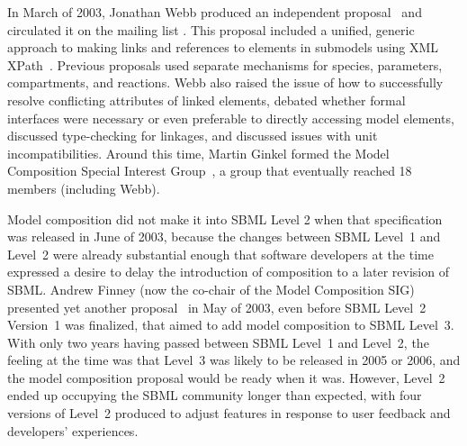 In March of 2003, Jonathan Webb produced an independent proposal~\citep{webb:2003} and circulated it on the mailing list .  This proposal included a unified, generic approach to making links and references to elements in submodels using XML XPath~\citep{xpath}.  Previous proposals used separate mechanisms for species, parameters, compartments, and reactions.  Webb also raised the issue of how to successfully resolve conflicting attributes of linked elements, debated whether formal interfaces were necessary or even preferable to directly accessing model elements, discussed type-checking for linkages, and discussed issues with unit incompatibilities.  Around this time, Martin Ginkel formed the Model Composition Special Interest Group~\citep{comp-sig}, a group that eventually reached 18 members (including Webb).

Model composition did not make it into SBML Level 2 when that specification was released in June of 2003, because the changes between SBML Level~1 and Level~2 were already substantial enough that software developers at the time expressed a desire to delay the introduction of composition to a later revision of SBML.  Andrew Finney (now the co-chair of the Model Composition SIG) presented yet another proposal~\citep{finney:2003} in May of 2003, even before SBML Level~2 Version~1 was finalized, that aimed to add model composition to SBML Level~3.  With only two years having passed between SBML Level~1 and Level~2, the feeling at the time was that Level~3 was likely to be released in 2005 or 2006, and the model composition proposal would be ready when it was.  However, Level~2 ended up occupying the SBML community longer than expected, with four versions of Level~2 produced to adjust features in response to user feedback and developers' experiences.

